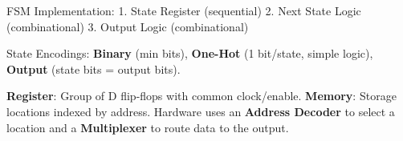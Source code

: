 \begin{remark}
FSM Implementation:
1. State Register (sequential)
2. Next State Logic (combinational)
3. Output Logic (combinational)
\end{remark}

\begin{example}
State Encodings: \textbf{Binary} (min bits), \textbf{One-Hot} (1 bit/state, simple logic), \textbf{Output} (state bits = output bits).
\end{example}

\begin{definition}
\textbf{Register}: Group of D flip-flops with common clock/enable.
\textbf{Memory}: Storage locations indexed by address. Hardware uses an \textbf{Address Decoder} to select a location and a \textbf{Multiplexer} to route data to the output.
\end{definition}
